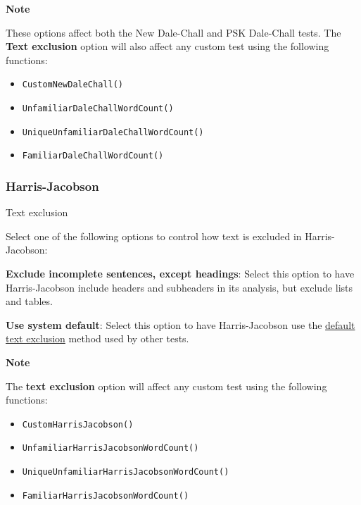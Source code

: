 \documentclass[
]{book}
\providecommand{\tightlist}{%
  \setlength{\itemsep}{0pt}\setlength{\parskip}{0pt}}
\newenvironment{notesection}
    {
    \begin{tcolorbox}[colframe=mediumblue,colback=lightblue,coltext=mediumblue,arc=3mm]
    \faLightbulb[regular] \textbf{Note} \newline
    }
    {
    \end{tcolorbox}
    }
\newenvironment{optionssection}
    {
    \begin{tcolorbox}[colframe=lightgray,colback=ultralightgray,sharp corners=all,parbox=false]
    }
    {
    \end{tcolorbox}
    }
\newenvironment{optionssectiontitle}
    {
    \begin{tcolorbox}[colframe=lightgray,colback=lightgray]
    \bfseries
    }
    {
    \end{tcolorbox}
    }
\theoremstyle{definition}
\theoremstyle{definition}
\theoremstyle{definition}
\theoremstyle{definition}
\theoremstyle{remark}
\begin{document}
\begin{notesection}

These options affect both the New Dale-Chall and PSK Dale-Chall tests. The \textbf{Text exclusion} option will also affect any custom test using the following functions:

\begin{itemize}
\tightlist
\item
  \texttt{CustomNewDaleChall()}
\item
  \texttt{UnfamiliarDaleChallWordCount()}
\item
  \texttt{UniqueUnfamiliarDaleChallWordCount()}
\item
  \texttt{FamiliarDaleChallWordCount()}
\end{itemize}

\end{notesection}

\hypertarget{options-harris-jacobson}{%
\subsubsection*{Harris-Jacobson}\label{options-harris-jacobson}}

\begin{optionssection}

\begin{optionssectiontitle}
Text exclusion

\end{optionssectiontitle}

Select one of the following options to control how text is excluded in Harris-Jacobson:

\textbf{Exclude incomplete sentences, except headings}: Select this option to have Harris-Jacobson include headers and subheaders in its analysis, but exclude lists and tables.

\textbf{Use system default}: Select this option to have Harris-Jacobson use the \protect\hyperlink{options-text-exclusion}{default text exclusion} method used by other tests.

\end{optionssection}

\begin{notesection}

The \textbf{text exclusion} option will affect any custom test using the following functions:

\begin{itemize}
\tightlist
\item
  \texttt{CustomHarrisJacobson()}
\item
  \texttt{UnfamiliarHarrisJacobsonWordCount()}
\item
  \texttt{UniqueUnfamiliarHarrisJacobsonWordCount()}
\item
  \texttt{FamiliarHarrisJacobsonWordCount()}
\end{itemize}

\end{notesection}
\end{document}
